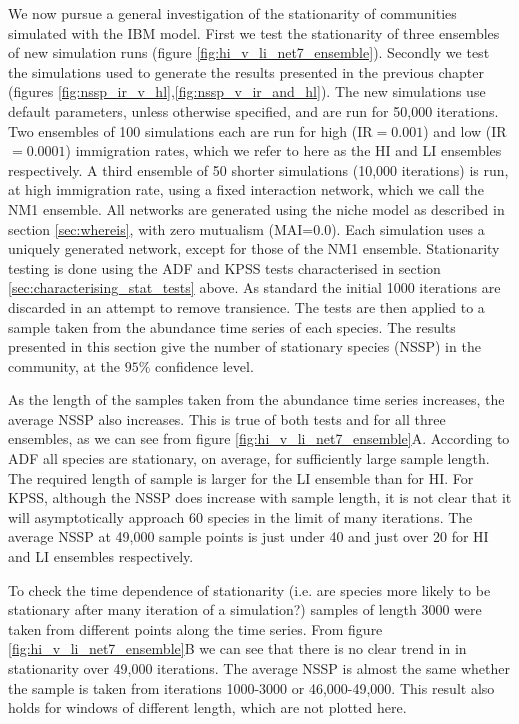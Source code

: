 We now pursue a general investigation of the stationarity of communities simulated with the IBM model. First we test the stationarity of three ensembles of new simulation runs (figure \ref{fig:hi_v_li_net7_ensemble}). Secondly we test the simulations used to generate the results presented in the previous chapter (figures \ref{fig:nssp_ir_v_hl},\ref{fig:nssp_v_ir_and_hl}). The new simulations use default parameters, unless otherwise specified, and are run for 50,000 iterations. Two ensembles of 100 simulations each are run for high (IR$=0.001$) and low (IR$=0.0001$) immigration rates, which we refer to here as the HI and LI ensembles respectively. A third ensemble of 50 shorter simulations (10,000 iterations) is run, at high immigration rate, using a fixed interaction network, which we call the NM1 ensemble. All networks are generated using the niche model as described in section \ref{sec:whereis}, with zero mutualism (MAI=$0.0$). Each simulation uses a uniquely generated network, except for those of the NM1 ensemble. Stationarity testing is done using the ADF and KPSS tests characterised in section \ref{sec:characterising_stat_tests} above. As standard the initial 1000 iterations are discarded in an attempt to remove transience. The tests are then applied to a sample taken from the abundance time series of each species. The results presented in this section give the number of stationary species (NSSP) in the community, at the $95\%$ confidence level.

As the length of the samples taken from the abundance time series increases, the average NSSP also increases. This is true of both tests and for all three ensembles, as we can see from figure \ref{fig:hi_v_li_net7_ensemble}A. According to ADF all species are stationary, on average, for sufficiently large sample length. The required length of sample is larger for the LI ensemble than for HI. For KPSS, although the NSSP does increase with sample length, it is not clear that it will asymptotically approach 60 species in the limit of many iterations. The average NSSP at 49,000 sample points is just under 40 and   just over 20 for HI and LI ensembles respectively.

To check the time dependence of stationarity (i.e. are species more likely to be stationary after many iteration of a simulation?) samples of length 3000 were taken from different points along the time series. From figure \ref{fig:hi_v_li_net7_ensemble}B we can see that there is no clear trend in in stationarity over 49,000 iterations. The average NSSP is almost the same whether the sample is taken from iterations 1000-3000 or 46,000-49,000. This result also holds for windows of different length, which are not plotted here.

